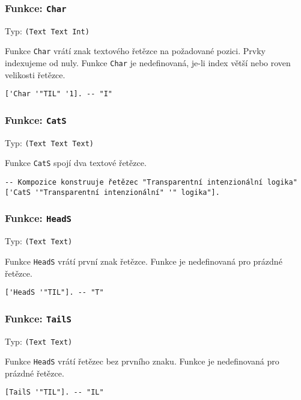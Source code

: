 \subsubsection*{Funkce: \lstinline{Char}}
Typ: \lstinline{(Text Text Int)}

Funkce \lstinline{Char} vrátí znak textového řetězce na požadované pozici. Prvky indexujeme od nuly.
Funkce \lstinline{Char} je nedefinovaná, je-li index větší nebo roven velikosti řetězce.


\begin{lstlisting}[caption={Ukázka využití Char}]
['Char '"TIL" '1]. -- "I"
\end{lstlisting}

\subsubsection*{Funkce: \lstinline{CatS}}
Typ: \lstinline{(Text Text Text)}

Funkce \lstinline{CatS} spojí dva textové řetězce.

\begin{lstlisting}[caption={Ukázka využití Char}]
-- Kompozice konstruuje řetězec "Transparentní intenzionální logika"
['CatS '"Transparentní intenzionální" '" logika"].
\end{lstlisting}

\subsubsection*{Funkce: \lstinline{HeadS}}
Typ: \lstinline{(Text Text)}

Funkce \lstinline{HeadS} vrátí první znak řetězce. Funkce je nedefinovaná pro prázdné řetězce.

\begin{lstlisting}[caption={Ukázka využití HeadS}]
['HeadS '"TIL"]. -- "T"
\end{lstlisting}

\subsubsection*{Funkce: \lstinline{TailS}}
Typ: \lstinline{(Text Text)}

Funkce \lstinline{HeadS} vrátí řetězec bez prvního znaku. Funkce je nedefinovaná pro prázdné
řetězce.

\begin{lstlisting}[caption={Ukázka využití TailS}]
[TailS '"TIL"]. -- "IL"
\end{lstlisting}


